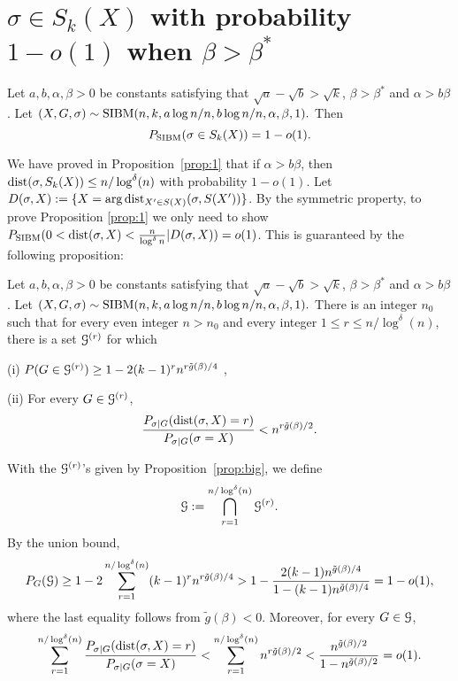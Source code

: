 \documentclass{article}
\begin{document}
\section{$\sigma \in S_k(X)$ with probability $1-o(1)$ when $\beta>\beta^\ast$} \label{sect:equal}
\begin{proposition} \label{prop:tt}
Let $a,b,\alpha,\beta> 0$ be constants satisfying that $\sqrt{a}-\sqrt{b} > \sqrt{k}$, $\beta>\beta^\ast$ and $\alpha>b\beta$. 
Let 
$
(X,G,\sigma) \sim \operatorname{SIBM}(n,k, a\log n/n, b\log n/n,\alpha,\beta, 1) .
$
Then
$$
P_{\operatorname{SIBM}}(\sigma \in S_k(X))=1-o(1) .
$$
\end{proposition}
We have proved in Proposition~\ref{prop:1} that if $\alpha>b\beta$, then $\operatorname{dist}(\sigma, S_k(X)) \le n/\log^{\delta}(n)$
with probability $1-o(1)$. Let $D(\sigma, X):= \{X = \arg\operatorname{dist}_{X'\in S(X)}(\sigma, S(X'))\}$.
By the symmetric property, to prove Proposition \ref{prop:1}
we only need to show $P_{\operatorname{SIBM}}( 0 <\operatorname{dist}(\sigma, X) < \frac{n}{\log^{\delta} n} | D(\sigma, X))=o(1) $.
This is guaranteed by the following proposition:
\begin{proposition} \label{prop:big}
Let $a,b,\alpha,\beta> 0$ be constants satisfying that $\sqrt{a}-\sqrt{b} > \sqrt{k}$, $\beta>\beta^\ast$ and $\alpha>b\beta$. 
Let 
$
(X,G,\sigma) \sim \operatorname{SIBM}(n,k,a\log n/n, b\log n/n,\alpha,\beta, 1) .
$
There is an integer $n_0$ such that for every even integer $n>n_0$ and  every integer $1\le r \le n/\log^{\delta}(n)$,
there is a set $\mathcal{G}^{(r)}$ for which

\noindent (i)
$P(G\in\mathcal{G}^{(r)}) \ge 1- 2(k-1)^r n^{r\tilde{g}(\beta)/4}$ ,

\noindent (ii) For every $G\in\mathcal{G}^{(r)}$,
$$
\frac{P_{\sigma|G}(\operatorname{dist}(\sigma, X)=r)}
{P_{\sigma|G}(\sigma=X)} <
n^{r \tilde{g}(\beta) /2} .
$$
\end{proposition}
With the $\mathcal{G}^{(r)}$'s given by Proposition~\ref{prop:big}, we
define 
$$
\mathcal{G}:=\bigcap_{r=1}^{n/\log^{\delta}(n)} \mathcal{G}^{(r)} .
$$
By the union bound,
$$
P_G(\mathcal{G})\ge 1-2 \sum_{r=1}^{n/\log^{\delta}(n)} (k-1)^rn^{r\tilde{g}(\beta)/4}
> 1- \frac{2 (k-1)n^{\tilde{g}(\beta)/4}}{1-(k-1)n^{\tilde{g}(\beta)/4}}
=1-o(1),
$$
where the last equality follows from $\tilde{g}(\beta)<0$. Moreover, for every $G\in\mathcal{G}$,
\begin{align*}
\sum_{r=1}^{n/\log^{\delta}(n)}
\frac{P_{\sigma|G}(\operatorname{dist}(\sigma, X) = r )}
{P_{\sigma|G}(\sigma=X)}
< \sum_{r=1}^{n/\log^{\delta}(n)}
n^{r \tilde{g}(\beta) /2}
< \frac{n^{\tilde{g}(\beta)/2}}{1-n^{\tilde{g}(\beta)/2}} =o(1) .
\end{align*}
\end{document}
